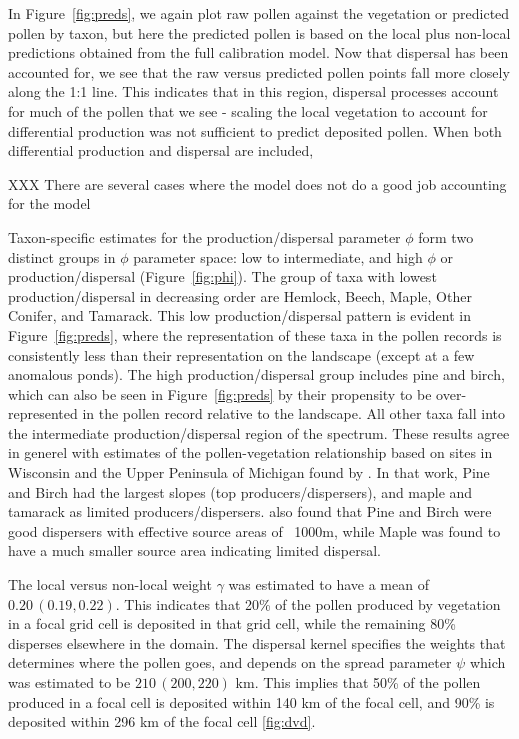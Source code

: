 \documentclass[12pt]{article}
\begin{document}
In Figure~\ref{fig:preds}, we again plot raw pollen against the vegetation
or predicted pollen by taxon, but here the predicted pollen is based
on the local plus non-local predictions obtained from the full
calibration model. Now that dispersal has been accounted for, we see
that the raw versus predicted pollen points fall more closely along
the 1:1 line. This indicates that in this region, dispersal processes account for much of the pollen that we see - scaling the local vegetation to account for differential production was not sufficient to predict deposited pollen. When both differential production and dispersal are included, 

XXX There are several cases where the model does not do a good job accounting for the model   

Taxon-specific estimates for the production/dispersal parameter $\phi$
form two distinct groups in $\phi$ parameter space: low to
intermediate, and high $\phi$ or production/dispersal
(Figure~\ref{fig:phi}). The group of taxa with lowest
production/dispersal in decreasing order are Hemlock, Beech, Maple,
Other Conifer, and Tamarack. This low production/dispersal pattern is
evident in Figure~\ref{fig:preds}, where the representation of these
taxa in the pollen records is consistently less than their
representation on the landscape (except at a few anomalous ponds). The
high production/dispersal group includes pine and birch, which can
also be seen in Figure~\ref{fig:preds} by their propensity to be
over-represented in the pollen record relative to the landscape. All
other taxa fall into the intermediate production/dispersal region of
the spectrum. These results agree in generel with estimates of the
pollen-vegetation relationship based on sites in Wisconsin and the
Upper Peninsula of Michigan found by \cite{prentice1986}. In that
work, Pine and Birch had the largest slopes (top
producers/dispersers), and maple and tamarack as limited
producers/dispersers. \cite{jackson1990} also found that Pine and
Birch were good dispersers with effective source areas of ~1000m,
while Maple was found to have a much smaller source area indicating
limited dispersal.

The local versus non-local weight $\gamma$ was estimated to have a
mean of $0.20\,(0.19, 0.22)$. This indicates that 20\% of the pollen
produced by vegetation in a focal grid cell is deposited in that grid
cell, while the remaining 80\% disperses elsewhere in the domain. The
dispersal kernel specifies the weights that determines where the
pollen goes, and depends on the spread parameter $\psi$ which was
estimated to be $210\,(200, 220)$ km. This implies that 50\% of the
pollen produced in a focal cell is deposited within 140 km of the
focal cell, and 90\% is deposited within 296 km of the focal cell \ref{fig:dvd}.
\end{document}
